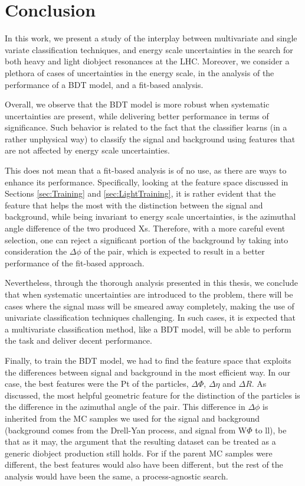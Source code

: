 \section{Conclusion}
\label{sec:org11ceed0}
In this work, we present a study of the interplay between multivariate and single variate classification techniques, and energy scale uncertainties in the search for both heavy and light diobject resonances at the LHC. Moreover, we consider a plethora of cases of uncertainties in the energy scale, in the analysis of the performance of a BDT model, and a fit-based analysis.

Overall, we observe that the BDT model is more robust when systematic uncertainties are present, while delivering better performance in terms of significance. Such behavior is related to the fact that the classifier learns (in a rather unphysical way) to classify the signal and background using features that are not affected by energy scale uncertainties.

This does not mean that a fit-based analysis is of no use, as there are ways to enhance its performance. Specifically, looking at the feature space discussed in Sections \ref{sec:Training} and \ref{sec:LightTraining}, it is rather evident that the feature that helps the most with the distinction between the signal and background, while being invariant to energy scale uncertainties, is the azimuthal angle difference of the two produced Xs. Therefore, with a more careful event selection, one can reject a significant portion of the background by taking into consideration the \(\Delta \phi\) of the pair, which is expected to result in a better performance of the fit-based approach.

Nevertheless, through the thorough analysis presented in this thesis, we conclude that when systematic uncertainties are introduced to the problem, there will be cases where the signal mass will be smeared away completely, making the use of univariate classification techniques challenging. In such cases, it is expected that a multivariate classification method, like a BDT model, will be able to perform the task and deliver decent performance.

Finally, to train the BDT model, we had to find the feature space that exploits the differences between signal and background in the most efficient way. In our case, the best features were the Pt of the particles, \(\Delta\Phi\), \(\Delta\eta\) and \(\Delta R\). As discussed, the most helpful geometric feature for the distinction of the particles is the difference in the azimuthal angle of the pair. This difference in \(\Delta \phi\) is inherited from the MC samples we used for the signal and background (background comes from the Drell-Yan process, and signal from W\(\Phi\) to ll), be that as it may, the argument that the resulting dataset can be treated as a generic diobject production still holds. For if the parent MC samples were different, the best features would also have been different, but the rest of the analysis would have been the same, a process-agnostic search.
